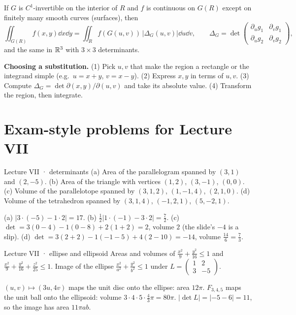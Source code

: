\begin{thm}
If $G$ is $C^1$-invertible on the interior of $R$ and $f$ is continuous on $G(R)$ except on finitely
many smooth curves (surfaces), then
\[ \iint_{G(R)}f(x,y)\dd x\dd y=\iint_Rf(G(u,v))\,|\Delta_G(u,v)|\dd u\dd v,\qquad
\Delta_G=\det\begin{pmatrix}\partial_ug_1&\partial_vg_1\\ \partial_ug_2&\partial_vg_2\end{pmatrix}, \]
and the same in $\mathbb{R}^3$ with $3\times3$ determinants.
\end{thm}

\begin{method}
\textbf{Choosing a substitution.} (1) Pick $u,v$ that make the region a rectangle or the
integrand simple (e.g.\ $u=x+y$, $v=x-y$). (2) Express $x,y$ in terms of $u,v$. (3) Compute
$\Delta_G=\det\partial(x,y)/\partial(u,v)$ and take its absolute value. (4) Transform the region,
then integrate.
\end{method}

\section{Exam-style problems for Lecture VII}

\begin{problem}{Lecture VII · determinants}
(a) Area of the parallelogram spanned by $(3,1)$ and $(2,-5)$. (b) Area of the triangle with
vertices $(1,2)$, $(3,-1)$, $(0,0)$. (c) Volume of the parallelotope spanned by $(3,1,2)$, $(1,-1,4)$,
$(2,1,0)$. (d) Volume of the tetrahedron spanned by $(3,1,4)$, $(-1,2,1)$, $(5,-2,1)$.
\end{problem}
\begin{solution}
(a) $|3\cdot(-5)-1\cdot2|=17$. (b) $\tfrac12|1\cdot(-1)-3\cdot2|=\tfrac72$.
(c) $\det=3(0-4)-1(0-8)+2(1+2)=2$, volume $2$ (the slide's $-4$ is a slip).
(d) $\det=3(2+2)-1(-1-5)+4(2-10)=-14$, volume $\tfrac{14}6=\tfrac73$.
\end{solution}

\begin{problem}{Lecture VII · ellipse and ellipsoid}
Areas and volumes of $\frac{x^2}9+\frac{y^2}{16}\le1$ and $\frac{x^2}9+\frac{y^2}{16}+\frac{z^2}{25}\le1$. Image of the
ellipse $\frac{x^2}{a^2}+\frac{y^2}{b^2}\le1$ under $L=\begin{pmatrix}1&2\\3&-5\end{pmatrix}$.
\end{problem}
\begin{solution}
$(u,v)\mapsto(3u,4v)$ maps the unit disc onto the ellipse: area $12\pi$. $F_{3,4,5}$ maps the unit ball onto
the ellipsoid: volume $3\cdot4\cdot5\cdot\frac43\pi=80\pi$. $|\det L|=|-5-6|=11$, so the image has area $11\pi ab$.
\end{solution}

